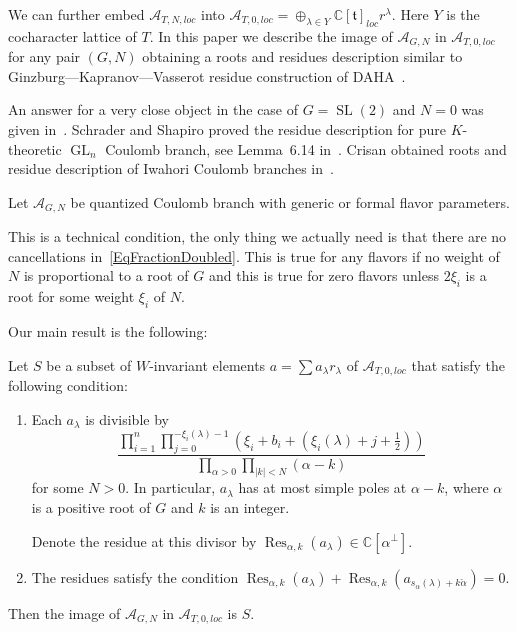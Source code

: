 \documentclass{article}
\renewcommand{\C}{\mathbb{C}}
\newcommand{\SL}{\mathop{\mathrm{SL}}\nolimits}
\newcommand{\GL}{\mathop{\mathrm{GL}}\nolimits}
\newcommand{\mf}{\mathfrak}
\newcommand{\mc}[1]{\mathcal{#1}}
\newcommand{\Res}{\operatorname{Res}}
\newcommand{\abs}[1]{\lvert #1\rvert}
\begin{document}
We can further embed $\mc{A}_{T,N,loc}$ into $\mc{A}_{T,0,loc}=\oplus_{\lambda\in Y} \C[\mf{t}]_{loc}r^{\lambda}$. Here $Y$ is the cocharacter lattice of $T$. In this paper we describe the image of $\mc{A}_{G,N}$ in $\mc{A}_{T,0,loc}$ for any pair $(G,N)$ obtaining a roots and residues description similar to Ginzburg---Kapranov---Vasserot residue construction of DAHA~\cite{GKV}.

 An answer for a very close object in the case of $G=\SL(2)$ and $N=0$ was given in~\cite{KV}. Schrader and Shapiro proved the residue description for pure $K$-theoretic $\GL_n$ Coulomb branch, see Lemma~6.14 in~\cite{SS}. Crisan obtained roots and residue description of Iwahori Coulomb branches in~\cite{Dragos}.


 Let $\mc{A}_{G,N}$ be quantized Coulomb branch with generic or formal flavor parameters.
 \begin{rem}
 This is a technical condition, the only thing we actually need is that there are no cancellations in~\eqref{EqFractionDoubled}. This is true for any flavors if no weight of $N$ is proportional to a root of $G$ and this is true for zero flavors unless $2\xi_i$ is a root for some weight $\xi_i$ of $N$.

\end{rem}  Our main result is the following:
\begin{thr*}
 Let $S$ be a subset of $W$-invariant elements $a=\sum a_{\lambda} r_{\lambda}$ of $\mc{A}_{T,0,loc}$ that satisfy the following condition: 
\begin{enumerate}
\item
Each $a_{\lambda}$ is divisible by 
\begin{equation}
\label{EqFractionDoubled}
\frac{\prod_{i=1}^n \prod_{j=0}^{-\xi_i(\lambda)-1}(\xi_i+b_i+(\xi_i(\lambda)+j+\tfrac12))}{\prod_{\alpha>0}\prod_{\abs{k}<N}(\alpha-k)}
\end{equation} 
for some $N>0$. In particular, $a_{\lambda}$ has at most simple poles at $\alpha-k$, where $\alpha$ is a positive root of $G$ and $k$ is an integer. 

Denote the residue at this divisor by $\Res_{\alpha,k}(a_{\lambda})\in \C[\alpha^{\perp}]$.

\item
The residues satisfy the condition $\Res_{\alpha,k}(a_{\lambda})+\Res_{\alpha,k}(a_{s_{\alpha}(\lambda)+k\check{\alpha}})=0$.
\end{enumerate}

Then the image of $\mc{A}_{G,N}$ in $\mc{A}_{T,0,loc}$ is $S$.
\end{thr*}
\end{document}
